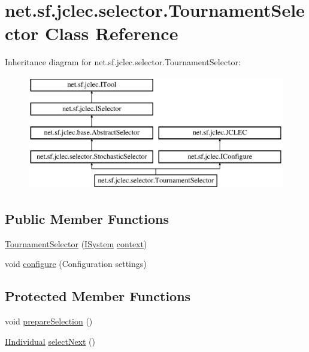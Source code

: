 \hypertarget{classnet_1_1sf_1_1jclec_1_1selector_1_1_tournament_selector}{\section{net.\-sf.\-jclec.\-selector.\-Tournament\-Selector Class Reference}
\label{classnet_1_1sf_1_1jclec_1_1selector_1_1_tournament_selector}
}
Inheritance diagram for net.\-sf.\-jclec.\-selector.\-Tournament\-Selector\-:\begin{figure}[H]
\begin{center}
\leavevmode
\includegraphics[height=5.000000cm]{classnet_1_1sf_1_1jclec_1_1selector_1_1_tournament_selector}
\end{center}
\end{figure}
\subsection*{Public Member Functions}
\begin{DoxyCompactItemize}
\item 
\hyperlink{classnet_1_1sf_1_1jclec_1_1selector_1_1_tournament_selector_a1eb3f234feb201af87a5ba55999121d5}{Tournament\-Selector} (\hyperlink{interfacenet_1_1sf_1_1jclec_1_1_i_system}{I\-System} \hyperlink{classnet_1_1sf_1_1jclec_1_1base_1_1_abstract_selector_a4304fe5c27aa7631dc91678d22473b94}{context})
\item 
void \hyperlink{classnet_1_1sf_1_1jclec_1_1selector_1_1_tournament_selector_a8acd1b57a5d93b4c690cbd84afe9db07}{configure} (Configuration settings)
\end{DoxyCompactItemize}
\subsection*{Protected Member Functions}
\begin{DoxyCompactItemize}
\item 
void \hyperlink{classnet_1_1sf_1_1jclec_1_1selector_1_1_tournament_selector_a9748d4136a0ceaaf1fac9689d56479e0}{prepare\-Selection} ()
\item 
\hyperlink{interfacenet_1_1sf_1_1jclec_1_1_i_individual}{I\-Individual} \hyperlink{classnet_1_1sf_1_1jclec_1_1selector_1_1_tournament_selector_af2743032d654d6bac87391ddfab4cd1a}{select\-Next} ()
\end{DoxyCompactItemize}

